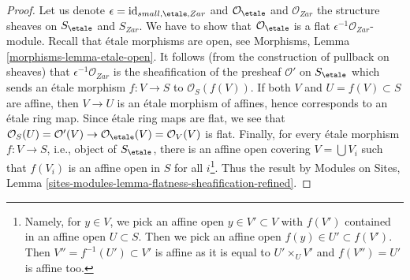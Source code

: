 \begin{proof}
Let us denote $\epsilon = \text{id}_{small, \etale, Zar}$ and
$\mathcal{O}_\etale$ and $\mathcal{O}_{Zar}$ the structure
sheaves on $S_\etale$ and $S_{Zar}$. We have to show that
$\mathcal{O}_\etale$ is a flat $\epsilon^{-1}\mathcal{O}_{Zar}$-module.
Recall that \'etale morphisms are open, see
Morphisms, Lemma \ref{morphisms-lemma-etale-open}.
It follows (from the construction of pullback on sheaves)
that $\epsilon^{-1}\mathcal{O}_{Zar}$ is the sheafification
of the presheaf $\mathcal{O}'$ on $S_\etale$
which sends an \'etale morphism $f : V \to S$ to $\mathcal{O}_S(f(V))$.
If both $V$ and $U = f(V) \subset S$ are affine,
then $V \to U$ is an \'etale morphism of affines,
hence corresponds to an \'etale ring map.
Since \'etale ring maps are flat, we see that
$\mathcal{O}_S(U) = \mathcal{O}'(V) \to
\mathcal{O}_\etale(V) = \mathcal{O}_V(V)$ is flat.
Finally, for every \'etale morphism $f : V \to S$, i.e., object of
$S_\etale$, there is an affine open covering $V = \bigcup V_i$
such that $f(V_i)$ is an affine open in
$S$ for all $i$\footnote{Namely, for $y \in V$, we pick an affine open
$y \in V' \subset V$ with $f(V')$ contained in an affine
open $U \subset S$. Then we pick an affine open $f(y) \in U' \subset f(V')$.
Then $V'' = f^{-1}(U') \subset V'$ is affine as it is equal
to $U' \times_U V'$ and $f(V'') = U'$ is affine too.}.
Thus the result by Modules on Sites, Lemma
\ref{sites-modules-lemma-flatness-sheafification-refined}.
\end{proof}

